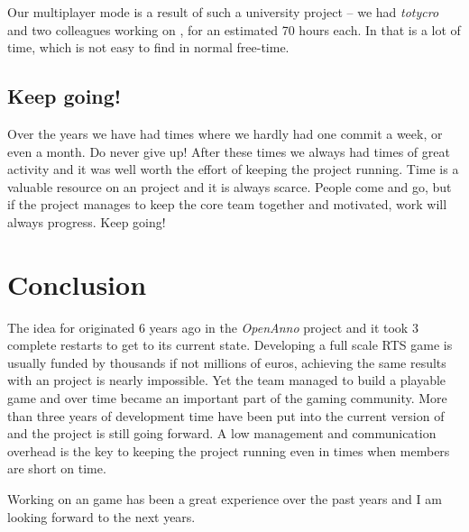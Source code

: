 Our multiplayer mode is a result of such a university project -- we had \textit{totycro} and two colleagues working on \UH{}, for an
estimated 70 hours each. In \OS{} that is a lot of time, which is not easy to find in normal free-time.

\subsection{Keep going!}
Over the years we have had times where we hardly had one commit a week, or even a month. Do never give up! After these
times we always had times of great activity and it was well worth the effort of keeping the project running. Time is a
valuable resource on an \OS{} project and it is always scarce. People come and go, but if the project manages to keep
the core team together and motivated, work will always progress. Keep going!

\section{Conclusion}
The idea for \UH{} originated 6 years ago in the \textit{OpenAnno} project and it took 3 complete restarts to get to its
current state. Developing
a full scale RTS game is usually funded by thousands if not millions of euros, achieving the same results with an \OS{}
project is nearly impossible. Yet the team managed to build a playable game and over time became an important part of
the \OS{} gaming community. More than three years of development time have been put into the current version of \UH{} and the
project is still going forward. A low management and communication overhead is the key to keeping the project running
even in times when members are short on time.

Working on an \OS{} game has been a great experience over the past years and I am looking forward to the next years.


